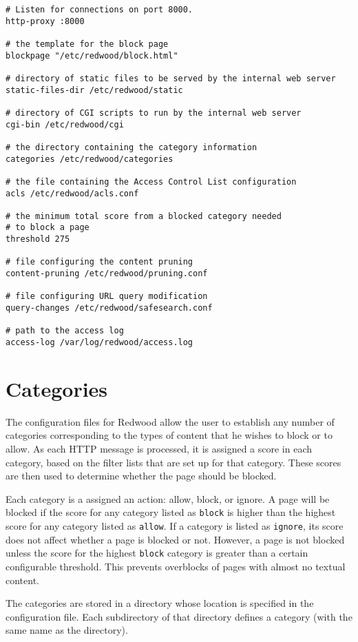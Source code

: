 \documentclass{article}
\begin{document}
\begin{verbatim}
# Listen for connections on port 8000.
http-proxy :8000

# the template for the block page
blockpage "/etc/redwood/block.html"

# directory of static files to be served by the internal web server
static-files-dir /etc/redwood/static

# directory of CGI scripts to run by the internal web server
cgi-bin /etc/redwood/cgi

# the directory containing the category information
categories /etc/redwood/categories

# the file containing the Access Control List configuration
acls /etc/redwood/acls.conf

# the minimum total score from a blocked category needed 
# to block a page
threshold 275

# file configuring the content pruning
content-pruning /etc/redwood/pruning.conf

# file configuring URL query modification
query-changes /etc/redwood/safesearch.conf

# path to the access log
access-log /var/log/redwood/access.log
\end{verbatim}

\section{Categories}

The configuration files for Redwood allow the user to establish any number of categories 
corresponding to the types of content that he wishes to block or to allow. 
As each HTTP message is processed, it is assigned a score in each category, 
based on the filter lists that are set up for that category. 
These scores are then used to determine whether the page should be blocked.

Each category is a assigned an action: allow, block, or ignore. 
A page will be blocked if the score for any category listed as \verb"block" 
is higher than the highest score for any category listed as \verb"allow". 
If a category is listed as \verb"ignore", its score does not affect whether a page 
is blocked or not. 
However, a page is not blocked unless the score for the highest \verb"block" category
is greater than a certain configurable threshold. This prevents overblocks 
of pages with almost no textual content.

The categories are stored in a directory whose location is specified in the configuration file. 
Each subdirectory of that directory defines a category (with the same name as the directory). 
\end{document}
